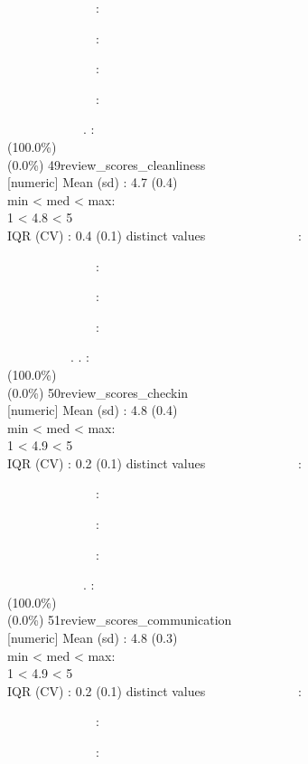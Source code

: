 \documentclass[
  journal,
]{IEEEtran}%
\begin{document}
\textbar~~~~~~~~~~~~~~:\\
\strut ~~~~~~~~~~~~~~:\\
\strut ~~~~~~~~~~~~~~:\\
\strut ~~~~~~~~~~~~~~:\\
\strut ~~~~~~~~~~~~. : \\
(100.0\%) \\
(0.0\%) \textbar{} \textbar{} 49\textbar review\_scores\_cleanliness\\
{[}numeric{]} \textbar Mean (sd) : 4.7 (0.4)\\
min \textless{} med \textless{} max:\\
1 \textless{} 4.8 \textless{} 5\\
IQR (CV) : 0.4 (0.1)  distinct values \textbar{}
\textbar~~~~~~~~~~~~~~:\\
\strut ~~~~~~~~~~~~~~:\\
\strut ~~~~~~~~~~~~~~:\\
\strut ~~~~~~~~~~~~~~:\\
\strut ~~~~~~~~~~. . : \\
(100.0\%) \\
(0.0\%) \textbar{} \textbar{} 50\textbar review\_scores\_checkin\\
{[}numeric{]} \textbar Mean (sd) : 4.8 (0.4)\\
min \textless{} med \textless{} max:\\
1 \textless{} 4.9 \textless{} 5\\
IQR (CV) : 0.2 (0.1)  distinct values \textbar{}
\textbar~~~~~~~~~~~~~~:\\
\strut ~~~~~~~~~~~~~~:\\
\strut ~~~~~~~~~~~~~~:\\
\strut ~~~~~~~~~~~~~~:\\
\strut ~~~~~~~~~~~~. : \\
(100.0\%) \\
(0.0\%) \textbar{} \textbar{} 51\textbar review\_scores\_communication\\
{[}numeric{]} \textbar Mean (sd) : 4.8 (0.3)\\
min \textless{} med \textless{} max:\\
1 \textless{} 4.9 \textless{} 5\\
IQR (CV) : 0.2 (0.1)  distinct values \textbar{}
\textbar~~~~~~~~~~~~~~:\\
\strut ~~~~~~~~~~~~~~:\\
\strut ~~~~~~~~~~~~~~:\\
\end{document}
